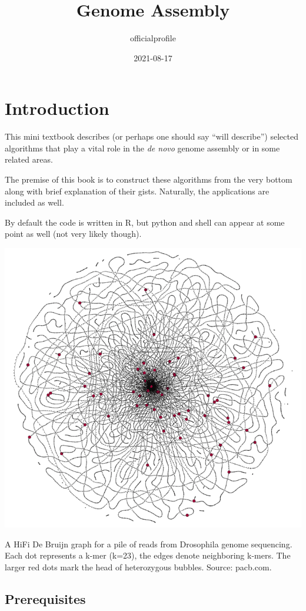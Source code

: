 \documentclass[
]{book}
\title{Genome Assembly}
\author{officialprofile}
\date{2021-08-17}
\begin{document}
\maketitle

{
\setcounter{tocdepth}{1}
\tableofcontents
}
\hypertarget{introduction}{%
\chapter{Introduction}\label{introduction}}

This mini textbook describes (or perhaps one should say ``will describe'') selected algorithms that play a vital role in the \emph{de novo} genome assembly or in some related areas.

The premise of this book is to construct these algorithms from the very bottom along with brief explanation of their gists. Naturally, the applications are included as well.

By default the code is written in R, but python and shell can appear at some point as well (not very likely though).

\begin{center}\includegraphics[width=0.8\linewidth]{img/cover} \end{center}

A HiFi De Bruijn graph for a pile of reads from Drosophila genome sequencing. Each dot represents a k-mer (k=23), the edges denote neighboring k-mers. The larger red dots mark the head of heterozygous bubbles. Source: pacb.com.

\hypertarget{prerequisites}{%
\section{Prerequisites}\label{prerequisites}}
\end{document}
